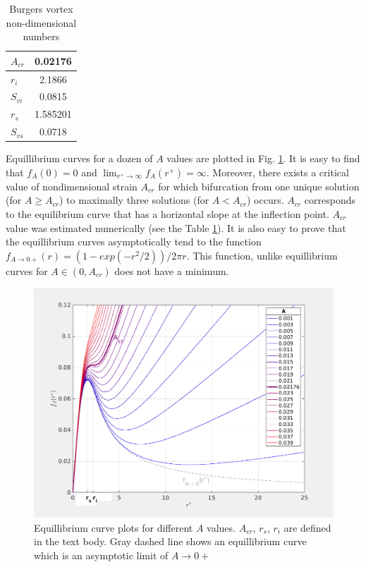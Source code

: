 \documentclass[../main.tex]{subfiles}
\begin{document}
\begin{table}
\small
\tabcolsep=0.2cm
\centering
\caption{Burgers vortex non-dimensional numbers}
\centering
\begin{tabular}{|l|c|}
\hline 
$A_{cr}$ & 0.02176 \\
\hline
$r_i$ & 2.1866\\
\hline
$S_{v i}$ & 0.0815\\
\hline
$r_s$ & 1.585201\\
\hline
$S_{v s}$ & 0.0718\\
\hline
\end{tabular}
\label{tab:ch3_2}
\end{table}

Equillibrium curves for a dozen of $A$ values are plotted in Fig. \ref{fig:ch3_6}. It is easy to find that $f_A(0)=0$ and $\lim_{r^+\to\infty} f_A(r^+)=\infty$. Moreover, there exists a critical value of nondimensional strain $A_{cr}$ for which bifurcation from one unique solution (for $A \geq A_{cr}$) to maximally three solutions (for $A<A_{cr}$) occurs. $A_{cr}$ corresponds to the equilibrium curve that has a horizontal slope at the inflection point. $A_{cr}$ value was estimated numerically (see the Table \ref{tab:ch3_2}). It is also easy to prove that the equillibrium curves asymptotically tend to the function $f_{A \rightarrow 0+}(r)=\left( 1-exp(-r^2/2)\right)/2\pi r$. This function, unlike equillibrium curves for $A \in (0,A_{cr})$ does not have a minimum.

\begin{figure}
\centering
\noindent \includegraphics[width=30pc]{gfx/eq_curves.png}
\caption{Equillibrium curve plots for different $A$ values. $A_{cr}$, $r_s$, $r_i$ are defined in the text body. Gray dashed line shows an equillibrium curve which is an asymptotic limit of $A \rightarrow 0+$}
\label{fig:ch3_6}
\end{figure}
\end{document}

